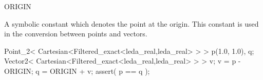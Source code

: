 \begin{ccRefConstant}{ORIGIN}


\ccDefinition
A symbolic constant which denotes the point at the origin.
This constant is used in the conversion between points and vectors.

\ccExample

\begin{cprog}
  Point_2< Cartesian<Filtered_exact<leda_real,leda_real> > >  p(1.0, 1.0), q;
  Vector2< Cartesian<Filtered_exact<leda_real,leda_real> > >  v;
  v = p - ORIGIN;
  q = ORIGIN + v;  
  assert( p == q );
\end{cprog} 

\end{ccRefConstant}
